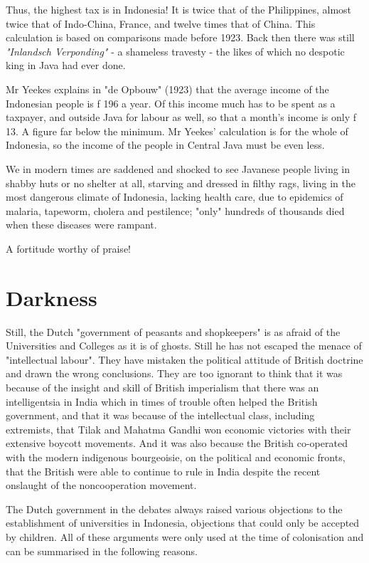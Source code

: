 Thus, the highest tax is in Indonesia! It is twice that of the Philippines, 
almost twice that of Indo-China, France, and twelve times that of China. 
This calculation is based on comparisons made before 1923. Back then there was still 
\emph{"Inlandsch Verponding"} - a shameless travesty - the likes of which no despotic king in Java had ever done.\nline

Mr Yeekes explains in "de Opbouw" (1923) that the average income 
of the Indonesian people is f 196 a year. Of this income much has 
to be spent as a taxpayer, and outside Java for labour as well, 
so that a month's income is only f 13. A figure far below the minimum. 
Mr Yeekes' calculation is for the whole of Indonesia, so the income of 
the people in Central Java must be even less.\nline

We in modern times are saddened and shocked to see Javanese people 
living in shabby huts or no shelter at all, starving and dressed in 
filthy rags, living in the most dangerous climate of Indonesia, lacking 
health care, due to epidemics of malaria, tapeworm, cholera and pestilence; 
"only" hundreds of thousands died when these diseases were rampant.\nline

A fortitude worthy of praise!

\section{Darkness}

Still, the Dutch "government of peasants and shopkeepers" is as afraid of the 
Universities and Colleges as it is of ghosts. Still he has not escaped the menace 
of "intellectual labour". They have mistaken the political attitude of British doctrine 
and drawn the wrong conclusions. They are too ignorant to think that it was 
because of the insight and skill of British imperialism that there was an 
intelligentsia in India which in times of trouble often helped the British 
government, and that it was because of the intellectual class, including extremists, 
that Tilak and Mahatma Gandhi won economic victories with their extensive boycott movements. 
And it was also because the British co-operated with the modern indigenous bourgeoisie, on 
the political and economic fronts, that the British were able to continue to rule in India 
despite the recent onslaught of the noncooperation movement.\nline

The Dutch government in the debates always raised various objections to the establishment 
of universities in Indonesia, objections that could only be accepted by children. All of 
these arguments were only used at the time of colonisation and can be summarised in the following reasons.\nline

